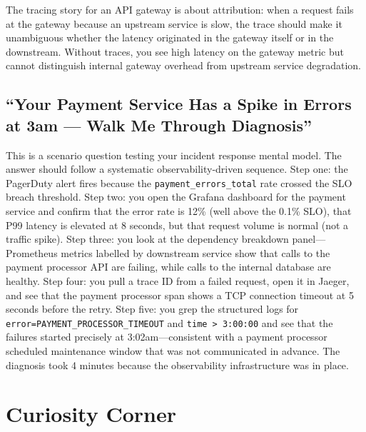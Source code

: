\documentclass[11pt,a4paper]{article}
\begin{document}
The tracing story for an API gateway is about attribution: when a request fails at the gateway because an upstream service is slow, the trace should make it unambiguous whether the latency originated in the gateway itself or in the downstream. Without traces, you see high latency on the gateway metric but cannot distinguish internal gateway overhead from upstream service degradation.

\subsection{``Your Payment Service Has a Spike in Errors at 3am --- Walk Me Through Diagnosis''}

This is a scenario question testing your incident response mental model. The answer should follow a systematic observability-driven sequence. Step one: the PagerDuty alert fires because the \texttt{payment\_errors\_total} rate crossed the SLO breach threshold. Step two: you open the Grafana dashboard for the payment service and confirm that the error rate is 12\% (well above the 0.1\% SLO), that P99 latency is elevated at 8 seconds, but that request volume is normal (not a traffic spike). Step three: you look at the dependency breakdown panel---Prometheus metrics labelled by downstream service show that calls to the payment processor API are failing, while calls to the internal database are healthy. Step four: you pull a trace ID from a failed request, open it in Jaeger, and see that the payment processor span shows a TCP connection timeout at 5 seconds before the retry. Step five: you grep the structured logs for \texttt{error=PAYMENT\_PROCESSOR\_TIMEOUT} and \texttt{time > 3:00:00} and see that the failures started precisely at 3:02am---consistent with a payment processor scheduled maintenance window that was not communicated in advance. The diagnosis took 4 minutes because the observability infrastructure was in place.

\section{Curiosity Corner}
\end{document}
